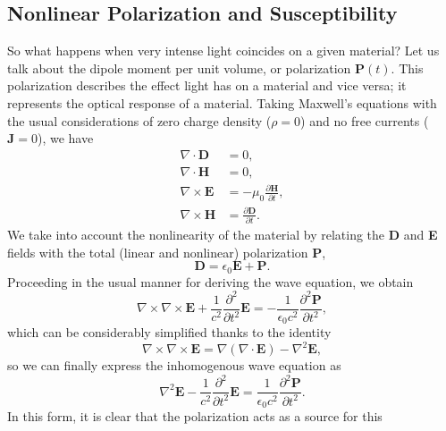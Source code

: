 
\subsection{Nonlinear Polarization and Susceptibility}

So what happens when very intense light coincides on a given material? Let us
talk about the dipole moment per unit volume, or polarization $\mathbf{P}(t)$.
This polarization describes the effect light has on a material and vice versa;
it represents the optical response of a material. Taking Maxwell's equations
with the usual considerations of zero charge density ($\rho=0$) and no free
currents ($\mathbf{J}=0$), we have
\begin{align}
\nabla\cdot\mathbf{D} &= 0,\label{eq_max_1}\\
\nabla\cdot\mathbf{H} &= 0,\\
\nabla\times\mathbf{E} &= -\mu_{0}\frac{\partial\mathbf{H}}{\partial t},\\
\nabla\times\mathbf{H} &= \frac{\partial\mathbf{D}}{\partial t}.
\end{align}
We take into account the nonlinearity of the material by relating the \textbf{D}
and \textbf{E} fields with the total (linear and nonlinear) polarization
\textbf{P},
\begin{equation}
\mathbf{D} = \epsilon_{0}\mathbf{E} + \mathbf{P}.
\end{equation}
Proceeding in the usual manner for deriving the wave equation, we obtain
\begin{equation}
\nabla\times\nabla\times\mathbf{E} 
   + \frac{1}{c^{2}}\frac{\partial^{2}}{\partial t^{2}}\mathbf{E}
= -\frac{1}{\epsilon_{0}c^{2}}\frac{\partial^{2}\mathbf{P}}{\partial t^{2}},
\end{equation}
which can be considerably simplified thanks to the identity
\begin{equation}
\nabla\times\nabla\times\mathbf{E}
= \nabla\left(\nabla\cdot\mathbf{E}\right)-\nabla^{2}\mathbf{E},
\end{equation}
so we can finally express the inhomogenous wave equation as
\begin{equation}
\nabla^{2}\mathbf{E} 
- \frac{1}{c^{2}}\frac{\partial^{2}}{\partial t^{2}}\mathbf{E}
= \frac{1}{\epsilon_{0}c^{2}}\frac{\partial^{2}\mathbf{P}}{\partial t^{2}}.
\end{equation}
In this form, it is clear that the polarization acts as a source for this
